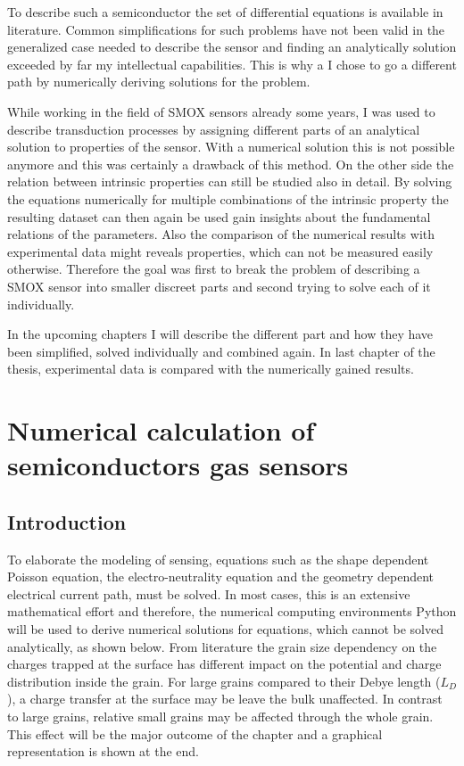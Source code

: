\documentclass[11pt]{article}
\begin{document}
To describe such a semiconductor the set of differential equations is
available in literature. Common simplifications for such problems have
not been valid in the generalized case needed to describe the sensor and
finding an analytically solution exceeded by far my intellectual
capabilities. This is why a I chose to go a different path by
numerically deriving solutions for the problem.

While working in the field of SMOX sensors already some years, I was
used to describe transduction processes by assigning different parts of
an analytical solution to properties of the sensor. With a numerical
solution this is not possible anymore and this was certainly a drawback
of this method. On the other side the relation between intrinsic
properties can still be studied also in detail. By solving the equations
numerically for multiple combinations of the intrinsic property the
resulting dataset can then again be used gain insights about the
fundamental relations of the parameters. Also the comparison of the
numerical results with experimental data might reveals properties, which
can not be measured easily otherwise. Therefore the goal was first to
break the problem of describing a SMOX sensor into smaller discreet
parts and second trying to solve each of it individually.

In the upcoming chapters I will describe the different part and how they
have been simplified, solved individually and combined again. In last
chapter of the thesis, experimental data is compared with the
numerically gained results.

    \hypertarget{numerical-calculation-of-semiconductors-gas-sensors}{%
\section{Numerical calculation of semiconductors gas
sensors}\label{numerical-calculation-of-semiconductors-gas-sensors}}

    \hypertarget{introduction}{%
\subsection{Introduction}\label{introduction}}

To elaborate the modeling of sensing, equations such as the shape
dependent Poisson equation, the electro-neutrality equation and the
geometry dependent electrical current path, must be solved. In most
cases, this is an extensive mathematical effort and therefore, the
numerical computing environments Python will be used to derive numerical
solutions for equations, which cannot be solved analytically, as shown
below. From literature \cite{Rothschild2004b} the grain size dependency
on the charges trapped at the surface has different impact on the
potential and charge distribution inside the grain. For large grains
compared to their Debye length (\(L_D\)), a charge transfer at the
surface may be leave the bulk unaffected. In contrast to large grains,
relative small grains may be affected through the whole grain. This
effect will be the major outcome of the chapter and a graphical
representation is shown at the end.
\end{document}
